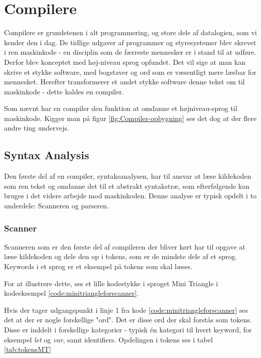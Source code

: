 \section{Compilere}
Compilere er grundstenen i alt programmering, og store dele af datalogien, som vi kender den i dag. De tidlige udgaver af programmer og styresystemer blev skrevet i ren maskinkode - en disciplin som de færreste mennesker er i stand til at udføre. Derfor blev konceptet med høj-niveau sprog opfundet. Det vil sige at man kan skrive et stykke software, med bogstaver og ord som er væsentligt mere læsbar for mennesket. Herefter transformerer et andet stykke software denne tekst om til maskinkode - dette kaldes en compiler.


\noindent Som nævnt har en compiler den funktion at omdanne et højniveau-sprog til maskinkode. Kigger man på figur \ref{fig:Compiler-opbygning} ses det dog at der flere andre ting undervejs.

\subsection{Syntax Analysis}\label{ssec:syntaxanalysis}
Den første del af en compiler, syntaksanalysen, har til ansvar at læse kildekoden som ren tekst og omdanne det til et abstrakt syntakstræ, som efterfølgende kan bruges i det videre arbejde mod maskinkoden. Denne analyse er typisk opdelt i to underdele: Scanneren og parseren. 

\subsubsection{Scanner}
Scanneren som er den første del af compileren der bliver kørt har til opgave at læse kildekoden og dele den op i tokens, som er de mindste dele af et sprog. Keywords i et sprog er et eksempel på tokens som skal læses.


For at illustrere dette, ses et lille kodestykke i sproget Mini Triangle i kodeeksempel \ref{code:minitriangleforscanner}.


\noindent Hvis der tager udgangspunkt i linje 1 fra kode \ref{code:minitriangleforscanner} ses det at der er nogle forskellige "ord"\mbox{}. Det er disse ord der skal forstås som tokens. Disse er inddelt i forskellige kategorier - typisk én kategori til hvert keyword, for eksempel \textit{let} og \textit{var}, samt identifiers. Opdelingen i tokens ses i tabel \ref{tab:tokensMT}


